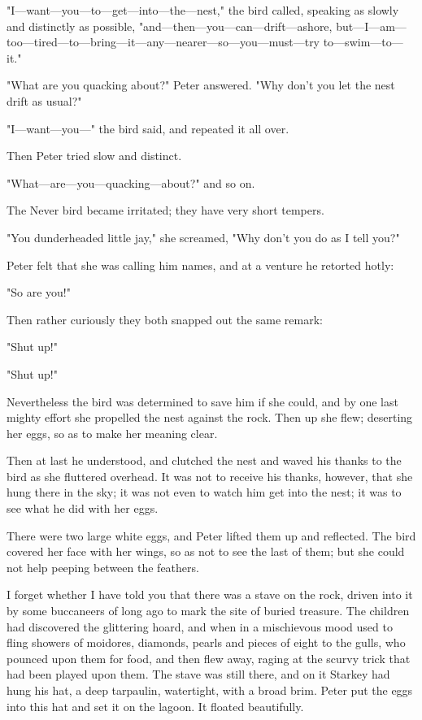 "I—want—you—to—get—into—the—nest," the bird called, speaking as slowly and distinctly as possible, "and—then—you—can—drift—ashore, but—I—am—too—tired—to—bring—it—any—nearer—so—you—must—try to—swim—to—it."

"What are you quacking about?\@" Peter answered.
"Why don't you let the nest drift as usual?"

"I—want—you—" the bird said, and repeated it all over.

Then Peter tried slow and distinct.

"What—are—you—quacking—about?\@" and so on.

The Never bird became irritated;
they have very short tempers.

"You dunderheaded little jay," she screamed, "Why don't you do as I tell you?"

Peter felt that she was calling him names, and at a venture he retorted hotly:

"So are you!"

Then rather curiously they both snapped out the same remark:

"Shut up!"

"Shut up!"

Nevertheless the bird was determined to save him if she could, and by one last mighty effort she propelled the nest against the rock.
Then up she flew;
deserting her eggs, so as to make her meaning clear.

Then at last he understood, and clutched the nest and waved his thanks to the bird as she fluttered overhead.
It was not to receive his thanks, however, that she hung there in the sky;
it was not even to watch him get into the nest;
it was to see what he did with her eggs.

There were two large white eggs, and Peter lifted them up and reflected.
The bird covered her face with her wings, so as not to see the last of them;
but she could not help peeping between the feathers.

I forget whether I have told you that there was a stave on the rock, driven into it by some buccaneers of long ago to mark the site of buried treasure.
The children had discovered the glittering hoard, and when in a mischievous mood used to fling showers of moidores, diamonds, pearls and pieces of eight to the gulls, who pounced upon them for food, and then flew away, raging at the scurvy trick that had been played upon them.
The stave was still there, and on it Starkey had hung his hat, a deep tarpaulin, watertight, with a broad brim.
Peter put the eggs into this hat and set it on the lagoon.
It floated beautifully.


